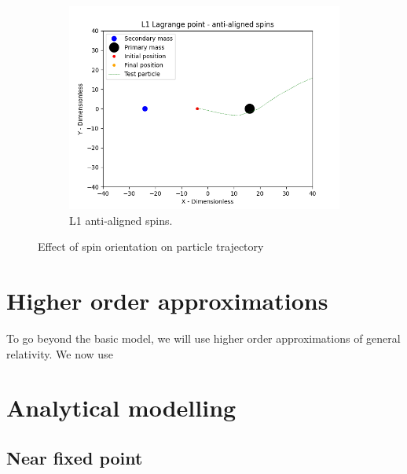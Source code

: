 \documentclass{article}
\begin{document}
\begin{figure}
\begin{subfigure}[b]{0.3\textwidth}
         \centering
         \includegraphics[width=\textwidth]{images/L1 anti-aligned spins.png}
         \caption{L1 anti-aligned spins.}
         \label{fig:L1 anti-aligned spins}
     \end{subfigure}
    \caption{Effect of spin orientation on particle trajectory}
    \label{fig:Spin orientation effect}
\end{figure}


\section{Higher order approximations}

To go beyond the basic model, we will use higher order approximations of general relativity. We now use 




\section{Analytical modelling}\label{sec:Analytic}

\subsection{Near fixed point}
\end{document}
